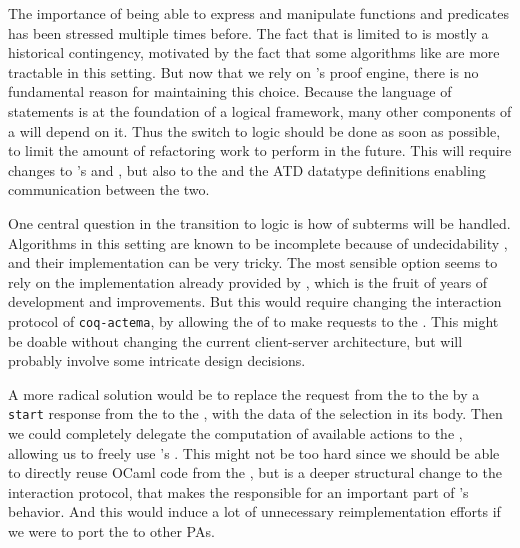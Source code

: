The importance of being able to express and manipulate  functions
and predicates has been stressed multiple times before. The fact that  is
limited to  is mostly a historical contingency, motivated by
the fact that some algorithms like  are more tractable in this
setting. But now that we rely on 's proof engine, there is no fundamental
reason for maintaining this choice. Because the language of statements is at the
foundation of a logical framework, many other components of a 
will depend on it. Thus the switch to  logic should be done as soon
as possible, to limit the amount of refactoring work to perform in the future.
This will require changes to 's  and ,
but also to the   and the ATD datatype definitions enabling
communication between the two.

One central question in the transition to  logic is how 
of subterms will be handled. Algorithms in this setting are known to be
incomplete because of undecidability , and
their implementation can be very tricky. The most sensible option seems to rely
on the implementation already provided by , which is the fruit of years of
development and improvements. But this would require changing the interaction
protocol of \texttt{coq-actema}, by allowing the  of  to
make  requests to the . This might be doable without
changing the current client-server architecture, but will probably involve some
intricate design decisions.

A more radical solution would be to replace the  request from
the  to the  by a \texttt{start} response
from the  to the , with the data of the
selection in its body. Then we could completely delegate the computation of
available actions to the , allowing us to freely use 's
. This might not be too hard since we should be able to directly
reuse OCaml code from the , but is a deeper structural change
to the interaction protocol, that makes the  responsible for an
important part of 's behavior. And this would induce a lot of unnecessary
reimplementation efforts if we were to port the  to other PAs.

